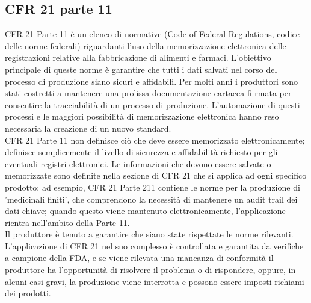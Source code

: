 \documentclass[12pt, a4paper, oneside]{book}
\begin{document}
\subsection{CFR 21 parte 11}
CFR 21 Parte 11 è un elenco di normative (Code of Federal Regulations, codice delle norme federali) riguardanti l'uso della memorizzazione elettronica delle registrazioni relative alla fabbricazione di alimenti e farmaci. L'obiettivo principale di queste norme è garantire che tutti i dati salvati nel corso del processo di produzione siano sicuri e affidabili. Per molti anni i produttori sono stati costretti a mantenere una prolissa documentazione cartacea fi rmata
per consentire la tracciabilità di un processo di produzione. L'automazione di questi processi e le maggiori possibilità di memorizzazione elettronica hanno reso necessaria la creazione di un nuovo standard.\\
CFR 21 Parte 11 non definisce ciò che deve essere memorizzato elettronicamente; definisce semplicemente il livello di sicurezza e affidabilità richiesto per gli eventuali registri elettronici. Le informazioni che devono essere salvate o memorizzate sono definite nella sezione di CFR 21 che si applica ad ogni specifico prodotto: ad esempio, CFR 21 Parte 211 contiene le norme per la produzione di 'medicinali finiti', che comprendono la necessità di mantenere un audit trail dei dati chiave; quando questo viene mantenuto elettronicamente, l'applicazione rientra nell'ambito della Parte 11.
\\Il produttore è tenuto a garantire che siano state rispettate le norme rilevanti. L'applicazione di CFR 21 nel suo complesso è controllata e garantita da verifiche a campione della FDA, e se viene rilevata una mancanza di conformità il produttore ha l'opportunità di risolvere il problema o di rispondere, oppure, in alcuni casi gravi, la produzione viene interrotta e possono essere imposti richiami dei prodotti.
\end{document}

